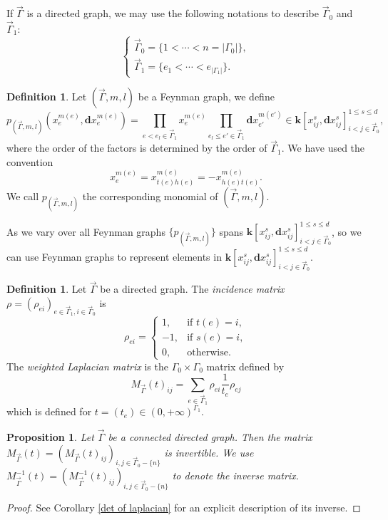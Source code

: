 \documentclass[11pt]{amsart}
\newtheorem{prop}[thm]{Proposition}
\theoremstyle{definition}
\newtheorem{defn}[thm]{Definition}
\theoremstyle{remark}
\numberwithin{equation}{section}
\begin{document}
If $\vec{\Gamma}$ is a directed graph, we may use the following notations to describe $\vec{\Gamma}_{0}$ and $\vec{\Gamma}_{1}$:
$$
\begin{cases}
    \vec{\Gamma}_{0}=\{1<\cdots<n=|\Gamma_{0}|\},\\
    \vec{\Gamma}_{1}=\{e_{1}<\cdots<e_{|\Gamma_{1}|}\}.
\end{cases}
$$
\begin{defn}\label{dfn:poly}
    Let $(\vec{\Gamma},m,l)$ be a Feynman graph, we define
    $$
    p_{(\vec{\Gamma},m,l)}(x_{e}^{m(e)},\mathbf{d}x_{e}^{m(e)})=\prod_{e<e_{l}\in\vec{\Gamma}_{1}}x_{e}^{m(e)}\prod_{e_l\leq e'\in\vec{\Gamma}_{1}}\mathbf{d}x_{e'}^{m(e')}\in \mathbf{k}[x_{ij}^{s},\mathbf{d}x_{ij}^{s}]_{i<j\in\vec{\Gamma}_{0}}^{1\leq s\leq d},
    $$
    where the order of the factors is determined by the order of $\vec{\Gamma}_{1}$. We have used the convention
    $$
    x_{e}^{m(e)}=x_{t(e)h(e)}^{m(e)}=-x_{h(e)t(e)}^{m(e)}.
    $$
    We call $p_{(\vec{\Gamma},m,l)}$ the corresponding monomial of $(\vec{\Gamma},m,l)$.
\end{defn}

As we vary over all Feynman graphs $\{p_{(\vec{\Gamma},m,l)}\}$ spans $\mathbf{k}[x_{ij}^{s},\mathbf{d}x_{ij}^{s}]_{i<j\in\vec{\Gamma}_{0}}^{1\leq s\leq d}$, so we can use Feynman graphs to represent elements in $\mathbf{k}[x_{ij}^{s},\mathbf{d}x_{ij}^{s}]_{i<j\in\vec{\Gamma}_{0}}^{1\leq s\leq d}$.


\begin{defn}
  Let $\vec{\Gamma}$ be a directed graph. The \textit{incidence matrix} $\rho=(\rho_{ei})_{e\in\vec{\Gamma}_{1},
  i\in\vec{\Gamma}_{0}}$ is
    $$
    \rho_{ei}=
    \begin{cases}
        1, &\text{if }t(e)=i,\\
        -1, &\text{if }s(e)=i,\\
        0, &\text{otherwise.}
    \end{cases}
    $$
    The \textit{weighted Laplacian matrix} is the $\Gamma_0 \times \Gamma_0$ matrix defined by
    $$
    M_{\vec{\Gamma}}(t)_{ij}=
    \sum_{e\in\vec{\Gamma}_{1}}\rho_{ei}\frac{1}{t_{e}}\rho_{ej}
    $$
    which is defined for $t = (t_e) \in (0,+\infty)^{\Gamma_1}$.
\end{defn}
\begin{prop}\label{Minverse}
    Let $\vec{\Gamma}$ be a connected directed graph.
    Then the matrix $M_{\vec{\Gamma}}(t)=(M_{\vec{\Gamma}}(t)_{ij})_{i,j\in\vec{\Gamma}_{0}-\{n\}}$ is invertible. We use $M^{-1}_{\vec{\Gamma}}(t)=(M^{-1}_{\vec{\Gamma}}(t)_{ij})_{i,j\in\vec{\Gamma}_{0}-\{n\}}$ to denote the inverse matrix.
\end{prop}
\begin{proof}
    See Corollary \ref{det of laplacian} for an explicit description of its inverse.
\end{proof}
\end{document}
